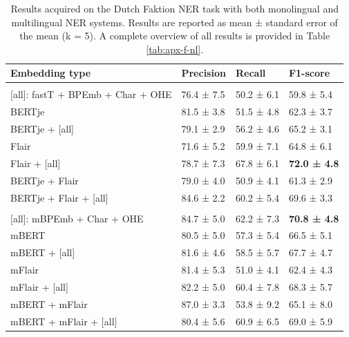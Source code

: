 \documentclass[12pt,a4paper,]{book}
\begin{document}
\begin{table}

\caption{\label{tab:faktion-nl-tab}Results acquired on the Dutch Faktion NER task with both monolingual and multilingual NER systems. Results are reported as mean ± standard error of the mean (k = 5). A complete overview of all results is provided in Table \ref{tab:apx-f-nl}.}
\centering
\begin{tabular}[t]{llll}
\toprule
Embedding type & Precision & Recall & F1-score\\
\midrule
\addlinespace[0.3em]
\multicolumn{4}{l}{\textbf{Monolingual embeddings}}\\
\hspace{1em}[all]: fastT + BPEmb + Char + OHE & 76.4 ± 7.5 & 50.2 ± 6.1 & 59.8 ± 5.4\\
\hspace{1em}BERTje & 81.5 ± 3.8 & 51.5 ± 4.8 & 62.3 ± 3.7\\
\hspace{1em}BERTje + [all] & 79.1 ± 2.9 & 56.2 ± 4.6 & 65.2 ± 3.1\\
\hspace{1em}Flair & 71.6 ± 5.2 & 59.9 ± 7.1 & 64.8 ± 6.1\\
\hspace{1em}Flair + [all] & 78.7 ± 7.3 & 67.8 ± 6.1 & \textbf{72.0 ± 4.8}\\
\hspace{1em}BERTje + Flair & 79.0 ± 4.0 & 50.9 ± 4.1 & 61.3 ± 2.9\\
\hspace{1em}BERTje + Flair + [all] & 84.6 ± 2.2 & 60.2 ± 5.4 & 69.6 ± 3.3\\
\addlinespace[0.3em]
\multicolumn{4}{l}{\textbf{Multilingual embeddings}}\\
\hspace{1em}[all]: mBPEmb + Char + OHE & 84.7 ± 5.0 & 62.2 ± 7.3 & \textbf{70.8 ± 4.8}\\
\hspace{1em}mBERT & 80.5 ± 5.0 & 57.3 ± 5.4 & 66.5 ± 5.1\\
\hspace{1em}mBERT + [all] & 81.6 ± 4.6 & 58.5 ± 5.7 & 67.7 ± 4.7\\
\hspace{1em}mFlair & 81.4 ± 5.3 & 51.0 ± 4.1 & 62.4 ± 4.3\\
\hspace{1em}mFlair + [all] & 82.2 ± 5.0 & 60.4 ± 7.8 & 68.3 ± 5.7\\
\hspace{1em}mBERT + mFlair & 87.0 ± 3.3 & 53.8 ± 9.2 & 65.1 ± 8.0\\
\hspace{1em}mBERT + mFlair + [all] & 80.4 ± 5.6 & 60.9 ± 6.5 & 69.0 ± 5.9\\
\bottomrule
\end{tabular}
\end{table}
\end{document}
